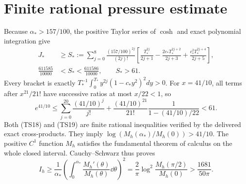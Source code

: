 \documentclass[11pt,a4paper]{article}
\begin{document}
\section{Finite rational pressure estimate}
Because $\alpha_*>157/100$, the positive Taylor series of $\cosh$
and exact polynomial integration give
\begin{equation}\tag{TS18}\begin{aligned}
 J_*&\geq S_*:=\sum_{j=0}^8\frac{(157/100)^{2j}}{(2j)!}
 \left[\frac{T_*^{2j}}{2j+1}-\frac{2c_*T_*^{2j+2}}{2j+3}
                +\frac{c_*^2T_*^{2j+4}}{2j+5}\right],\\
 \frac{611585}{10000}&<S_*<\frac{611586}{10000},\qquad S_*>61.
\end{aligned}\end{equation}
Every bracket is exactly
$T_*^{-1}\int_0^{T_*}y^{2j}(1-c_*y^2)^2dy>0$.
For $x=41/10$, all terms after $x^{21}/21!$ have successive
ratios at most $x/22<1$, so
\begin{equation}\tag{TS19}
 e^{41/10}\leq\sum_{j=0}^{20}\frac{(41/10)^j}{j!}
 +\frac{(41/10)^{21}}{21!}\frac1{1-(41/10)/22}<61.
\end{equation}
Both (TS18) and (TS19) are finite rational inequalities verified
by the delivered exact cross-products. They imply
$\log(M_h(\alpha_*)/M_h(0))>41/10$. The positive $C^1$ function
$M_h$ satisfies the fundamental theorem of calculus on the whole
closed interval. Cauchy--Schwarz thus proves
\begin{equation}\tag{TS20}
 I_h\geq\frac1{\alpha_*}
 \left(\int_0^{\alpha_*}\frac{M_h'(\theta)}{M_h(\theta)}\dd\theta\right)^2
 =\frac2\pi\log^2\frac{M_h(\pi/2)}{M_h(0)}
 >\frac{1681}{50\pi}.
\end{equation}
\end{document}
